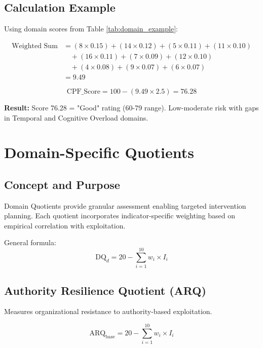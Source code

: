\documentclass[11pt,a4paper]{article}
\begin{document}
\subsection{Calculation Example}

Using domain scores from Table \ref{tab:domain_example}:

\begin{align*}
\text{Weighted Sum} &= (8 \times 0.15) + (14 \times 0.12) + (5 \times 0.11) + (11 \times 0.10) \\
&\quad + (16 \times 0.11) + (7 \times 0.09) + (12 \times 0.10) \\
&\quad + (4 \times 0.08) + (9 \times 0.07) + (6 \times 0.07) \\
&= 9.49
\end{align*}

\begin{equation}
\text{CPF\_Score} = 100 - (9.49 \times 2.5) = 76.28
\end{equation}

\textbf{Result:} Score 76.28 = "Good" rating (60-79 range). Low-moderate risk with gaps in Temporal and Cognitive Overload domains.

\section{Domain-Specific Quotients}

\subsection{Concept and Purpose}

Domain Quotients provide granular assessment enabling targeted intervention planning. Each quotient incorporates indicator-specific weighting based on empirical correlation with exploitation.

General formula:
\begin{equation}
\text{DQ}_d = 20 - \sum_{i=1}^{10} w_i \times I_i
\end{equation}

\subsection{Authority Resilience Quotient (ARQ)}

Measures organizational resistance to authority-based exploitation.

\begin{equation}
\text{ARQ}_{\text{base}} = 20 - \sum_{i=1}^{10} w_i \times I_i
\end{equation}
\end{document}
